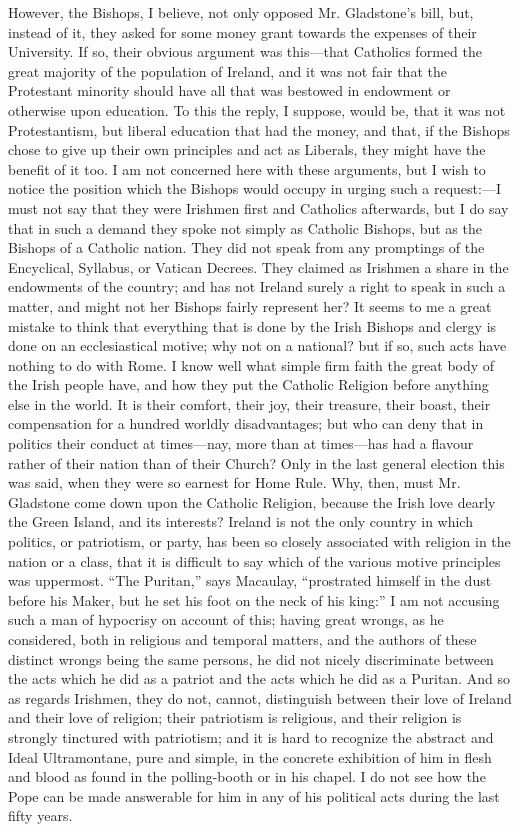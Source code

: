 However, the Bishops, I believe, not only opposed Mr. Gladstone's
bill, but, instead of it, they asked for some money grant towards the
expenses of their University. If so, their obvious argument was this—that
Catholics formed the great majority of the population of Ireland, and it
was not fair that the Protestant minority should have all that was
bestowed in endowment or otherwise upon education. To this the reply, I
suppose, would be, that it was not Protestantism, but liberal education
that had the money, and that, if the Bishops chose to give up their own
principles and act as Liberals, they might have the benefit of it too. I
am not concerned here with these arguments, but I wish to notice the
position which the Bishops would occupy in urging such a request:—I
must not say that they were Irishmen first and Catholics afterwards, but
I do say that in such a demand they spoke not simply as Catholic
Bishops, but as the Bishops of a Catholic nation. They did not speak
from any promptings of the Encyclical, Syllabus, or Vatican Decrees.
They claimed as Irishmen a share in the endowments of the country; and
has not Ireland surely a right to speak in such a matter, and might not
her Bishops fairly represent her? It seems to me a great mistake to
think that everything that is done by the Irish Bishops and clergy is
done on an ecclesiastical motive; why not on a national? but if so, such
acts have nothing to do with Rome. I know well what simple firm faith
the great body of the Irish people have, and how they put the Catholic
Religion before anything else in the world. It is their comfort, their
joy, their treasure, their boast, their compensation for a hundred worldly disadvantages; but who can deny that in politics their conduct
at times—nay, more than at times—has had a flavour rather of their
nation than of their Church? Only in the last general election this was
said, when they were so earnest for Home Rule. Why, then, must Mr.
Gladstone come down upon the Catholic Religion, because the Irish love
dearly the Green Island, and its interests? Ireland is not the only
country in which politics, or patriotism, or party, has been so closely
associated with religion in the nation or a class, that it is difficult
to say which of the various motive principles was uppermost. ``The
Puritan,'' says Macaulay, ``prostrated himself in the dust
before his Maker, but he set his foot on the neck of his king:'' I
am not accusing such a man of hypocrisy on account of this; having great
wrongs, as he considered, both in religious and temporal matters, and
the authors of these distinct wrongs being the same persons, he did not
nicely discriminate between the acts which he did as a patriot and the
acts which he did as a Puritan. And so as regards Irishmen, they do not,
cannot, distinguish between their love of Ireland and their love of
religion; their patriotism is religious, and their religion is strongly
tinctured with patriotism; and it is hard to recognize the abstract and
Ideal Ultramontane, pure and simple, in the concrete exhibition of him
in flesh and blood as found in the polling-booth or in his chapel. I do
not see how the Pope can be made answerable for him in any of his
political acts during the last fifty years.

